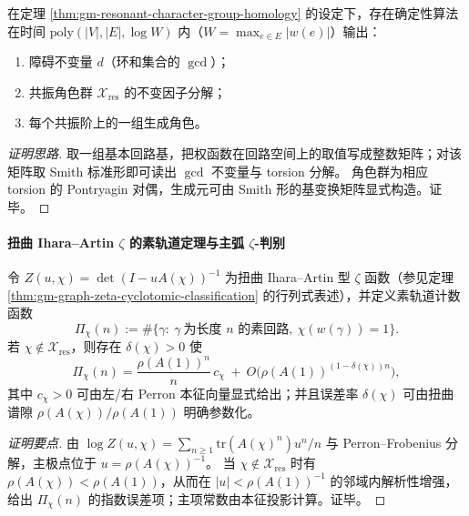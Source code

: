\begin{proposition}\label{prop:gm-smith-compute-obstructions}
在定理 \ref{thm:gm-resonant-character-group-homology} 的设定下，存在确定性算法在时间 \(\mathrm{poly}(|V|,|E|,\log W)\) 内（\(W=\max_{e\in E}|w(e)|\)）输出：
\begin{enumerate}
  \item 障碍不变量 \(d\)（环和集合的 \(\gcd\)）；
  \item 共振角色群 \(\mathcal{X}_{\mathrm{res}}\) 的不变因子分解；
  \item 每个共振阶上的一组生成角色。
\end{enumerate}
\end{proposition}

\begin{proof}[证明思路]
取一组基本回路基，把权函数在回路空间上的取值写成整数矩阵；对该矩阵取 Smith 标准形即可读出 \(\gcd\) 不变量与 torsion 分解。
角色群为相应 torsion 的 Pontryagin 对偶，生成元可由 Smith 形的基变换矩阵显式构造。证毕。
\end{proof}

\paragraph{扭曲 Ihara--Artin \texorpdfstring{$\zeta$}{zeta} 的素轨道定理与主弧 \texorpdfstring{$\zeta$}{zeta}-判别}
\begin{theorem}\label{thm:gm-twisted-zeta-prime-orbit}
令 \(Z(u,\chi)=\det(I-uA(\chi))^{-1}\) 为扭曲 Ihara--Artin 型 \(\zeta\) 函数（参见定理 \ref{thm:gm-graph-zeta-cyclotomic-classification} 的行列式表述），并定义素轨道计数函数
\[
\Pi_\chi(n):=\#\{\gamma:\ \gamma\ \text{为长度 }n\text{ 的素回路},\ \chi(w(\gamma))=1\}.
\]
若 \(\chi\notin\mathcal{X}_{\mathrm{res}}\)，则存在 \(\delta(\chi)>0\) 使
\[
\Pi_\chi(n)
=\frac{\rho(A(1))^n}{n}\,c_\chi\ +\ O\!\bigl(\rho(A(1))^{(1-\delta(\chi))n}\bigr),
\]
其中 \(c_\chi>0\) 可由左/右 Perron 本征向量显式给出；并且误差率 \(\delta(\chi)\) 可由扭曲谱隙 \(\rho(A(\chi))/\rho(A(1))\) 明确参数化。
\end{theorem}

\begin{proof}[证明要点]
由 \(\log Z(u,\chi)=\sum_{n\ge 1}\mathrm{tr}(A(\chi)^n)u^n/n\) 与 Perron--Frobenius 分解，主极点位于 \(u=\rho(A(\chi))^{-1}\)。
当 \(\chi\notin\mathcal{X}_{\mathrm{res}}\) 时有 \(\rho(A(\chi))<\rho(A(1))\)，从而在 \(|u|<\rho(A(1))^{-1}\) 的邻域内解析性增强，给出 \(\Pi_\chi(n)\) 的指数误差项；主项常数由本征投影计算。证毕。
\end{proof}

